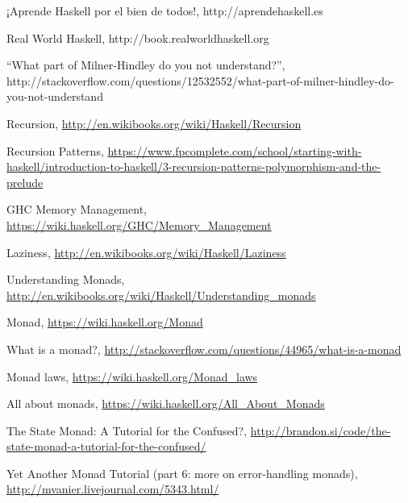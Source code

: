 \documentclass[a4paper]{article}
\begin{document}
\clearpage
\begin{thebibliography}{3}

  ¡Aprende Haskell por el bien de todos!, http://aprendehaskell.es

  Real World Haskell, http://book.realworldhaskell.org

  “What part of Milner-Hindley do you not understand?”, http://stackoverflow.com/questions/12532552/what-part-of-milner-hindley-do-you-not-understand

  Recursion, \url{http://en.wikibooks.org/wiki/Haskell/Recursion}

  Recursion Patterns,
  \url{https://www.fpcomplete.com/school/starting-with-haskell/introduction-to-haskell/3-recursion-patterns-polymorphism-and-the-prelude}

  GHC Memory Management, \url{https://wiki.haskell.org/GHC/Memory_Management}

  Laziness, \url{http://en.wikibooks.org/wiki/Haskell/Laziness}

  Understanding Monads, \url{http://en.wikibooks.org/wiki/Haskell/Understanding_monads}

  Monad, \url{https://wiki.haskell.org/Monad}

  What is a monad?, \url{http://stackoverflow.com/questions/44965/what-is-a-monad}

  Monad laws, \url{https://wiki.haskell.org/Monad_laws}

  All about monads, \url{https://wiki.haskell.org/All_About_Monads}

  The State Monad: A Tutorial for the Confused?, \url{http://brandon.si/code/the-state-monad-a-tutorial-for-the-confused/}

  Yet Another Monad Tutorial (part 6: more on error-handling monads), \url{http://mvanier.livejournal.com/5343.html/}

\end{thebibliography}
\end{document}
